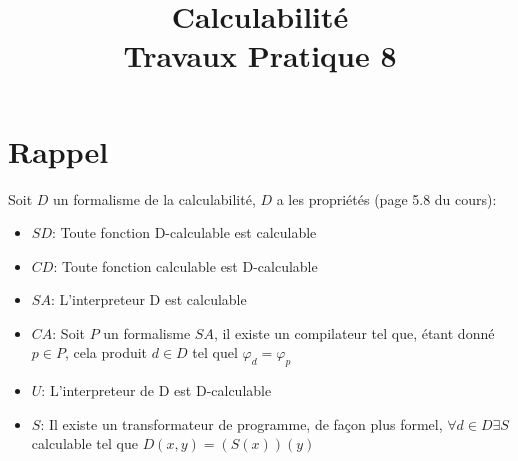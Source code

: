 \documentclass[a4paper, 11pt, onecolumn]{article}
\title{Calculabilité\\Travaux Pratique 8}
\date{}
\begin{document}
\maketitle

\section*{Rappel}
Soit $D$ un formalisme de la calculabilité, $D$ a les propriétés (page 5.8 du cours):
\begin{itemize}
\item $SD$: Toute fonction D-calculable est calculable
\item $CD$: Toute fonction calculable est D-calculable
\item $SA$: L'interpreteur D est calculable
\item $CA$: Soit $P$ un formalisme $SA$, il existe un compilateur tel que, étant donné $p\in P$, cela produit $d \in D$ tel quel $\varphi_d = \varphi_p$
\item $U$: L'interpreteur de D est D-calculable
\item $S$: Il existe un transformateur de programme, de façon plus formel, $\forall d \in D \exists S$ calculable tel que $D(x,y) = (S(x))(y)$
\end{itemize}
\end{document}
